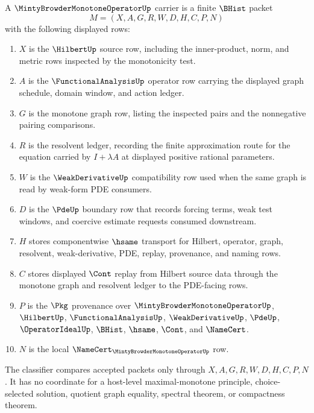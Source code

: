\begin{definition}
\label{def:minty-browder-monotone-operator-carrier}
A $\MintyBrowderMonotoneOperatorUp$ carrier is a finite $\BHist$ packet
$$
M=(X,A,G,R,W,D,H,C,P,N)
$$
with the following displayed rows:
\begin{enumerate}
\item $X$ is the $\HilbertUp$ source row, including the inner-product, norm, and metric rows inspected by the monotonicity test.
\item $A$ is the $\FunctionalAnalysisUp$ operator row carrying the displayed graph schedule, domain window, and action ledger.
\item $G$ is the monotone graph row, listing the inspected pairs and the nonnegative pairing comparisons.
\item $R$ is the resolvent ledger, recording the finite approximation route for the equation carried by $I+\lambda A$ at displayed positive rational parameters.
\item $W$ is the $\WeakDerivativeUp$ compatibility row used when the same graph is read by weak-form PDE consumers.
\item $D$ is the $\PdeUp$ boundary row that records forcing terms, weak test windows, and coercive estimate requests consumed downstream.
\item $H$ stores componentwise $\hsame$ transport for Hilbert, operator, graph, resolvent, weak-derivative, PDE, replay, provenance, and naming rows.
\item $C$ stores displayed $\Cont$ replay from Hilbert source data through the monotone graph and resolvent ledger to the PDE-facing rows.
\item $P$ is the $\Pkg$ provenance over $\MintyBrowderMonotoneOperatorUp$, $\HilbertUp$, $\FunctionalAnalysisUp$, $\WeakDerivativeUp$, $\PdeUp$, $\OperatorIdealUp$, $\BHist$, $\hsame$, $\Cont$, and $\NameCert$.
\item $N$ is the local $\NameCert_{\MintyBrowderMonotoneOperatorUp}$ row.
\end{enumerate}
The classifier compares accepted packets only through $X,A,G,R,W,D,H,C,P,N$. It has no coordinate for a host-level maximal-monotone principle, choice-selected solution, quotient graph equality, spectral theorem, or compactness theorem.
\end{definition}

